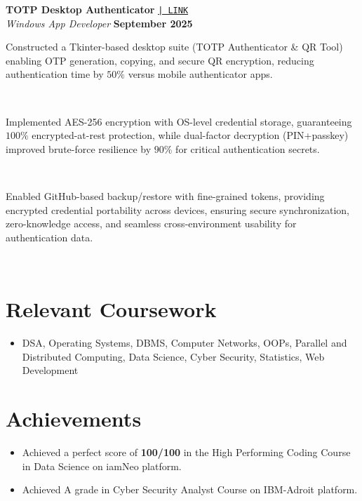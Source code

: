 \documentclass[a4paper,10pt]{article}
\begin{document}
\noindent
\textbf{TOTP Desktop Authenticator}
\href{https://github.com/ppriyanshu26/AuthPublic}{\texttt{| LINK}} \\
\textit{Windows App Developer} \hfill \textbf{September 2025} \\[-8pt]

\noindent\makebox[1.5em][l]{--}%
\parbox[t]{\dimexpr\linewidth-1.5em\relax}{%
Constructed a Tkinter-based desktop suite (TOTP Authenticator \& QR Tool) enabling OTP generation, copying, and secure QR encryption, reducing authentication time by $50\%$ versus mobile authenticator apps.} \\[0pt]

\noindent\makebox[1.5em][l]{--}%
\parbox[t]{\dimexpr\linewidth-1.5em\relax}{%
Implemented AES-256 encryption with OS-level credential storage, guaranteeing $100\%$ encrypted-at-rest protection, while dual-factor decryption (PIN+passkey) improved brute-force resilience by $90\%$ for critical authentication secrets.} \\[0pt]

\noindent\makebox[1.5em][l]{--}%
\parbox[t]{\dimexpr\linewidth-1.5em\relax}{%
Enabled GitHub-based backup/restore with fine-grained tokens, providing encrypted credential portability across devices, ensuring secure synchronization, zero-knowledge access, and seamless cross-environment usability for authentication data.} \\[4pt]


\vspace{-4pt}
\section{Relevant Coursework}
  \begin{itemize}
    \item DSA, Operating Systems, DBMS, Computer Networks, OOPs, Parallel and Distributed Computing, Data Science, Cyber Security, Statistics, Web Development
  \end{itemize}


\vspace{-4pt}
\section{Achievements}
  \begin{itemize}
    \item Achieved a perfect score of \textbf{100/100} in the High Performing Coding Course in Data Science on iamNeo platform.
    \item Achieved A grade in Cyber Security Analyst Course on IBM-Adroit platform.
  \end{itemize}
\end{document}
